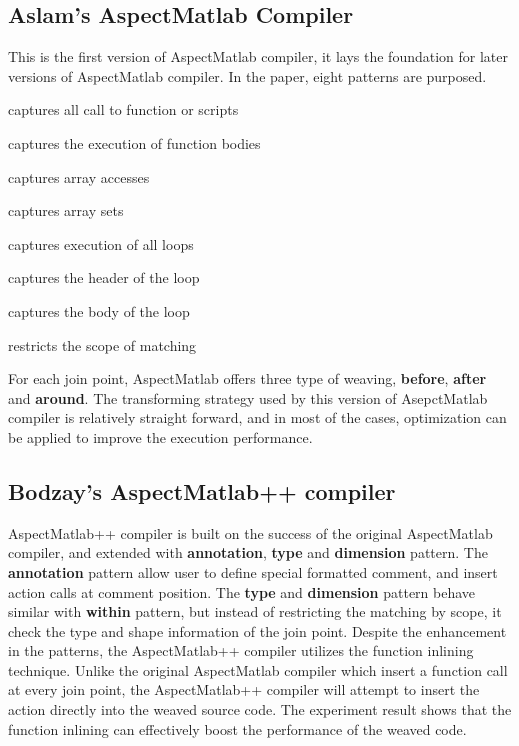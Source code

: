 \documentclass{comp621}
\begin{document}
\subsection*{Aslam's AspectMatlab Compiler\cite{ToheedMasterThesis}}
This is the first version of AspectMatlab compiler, it lays the  foundation for
later versions of AspectMatlab compiler. In the paper,  eight patterns are
purposed. 

\begin{description}[labelwidth =\widthof{\bfseries Execution}]
\item[Call] captures all call to function or scripts
\item[Execution] captures the execution of function bodies
\item[Get] captures array accesses
\item[Set] captures array sets
\item[Loop] captures execution of all loops
\item[LoopHead] captures the header of the loop
\item[LoopBody] captures the body of the loop
\item[Within] restricts the scope of matching
\end{description}

For each join point, AspectMatlab offers three type of weaving,
\textbf{before}, \textbf{after} and \textbf{around}. The transforming strategy
used by this version of AsepctMatlab compiler is relatively straight forward,
and in most of the cases, optimization can be applied to improve the execution
performance.

\subsection*{Bodzay's AspectMatlab++ compiler\cite{AndrewMasterThesis}}
AspectMatlab++ compiler is built on the success of the original AspectMatlab
compiler, and extended with \textbf{annotation}, \textbf{type} and
\textbf{dimension} pattern. The \textbf{annotation} pattern allow user to
define special formatted comment, and insert action calls at comment position.
The \textbf{type} and \textbf{dimension} pattern behave similar with
\textbf{within} pattern, but instead of restricting the matching by scope, it
check the type and shape information of the join point. Despite the enhancement
in the patterns, the AspectMatlab++ compiler utilizes the function inlining
technique. Unlike the original AspectMatlab compiler which insert a function
call at every join point, the AspectMatlab++ compiler will attempt to insert
the action directly into the weaved source code. The experiment result shows
that the function inlining can effectively boost the performance of the weaved
code.
\end{document}
